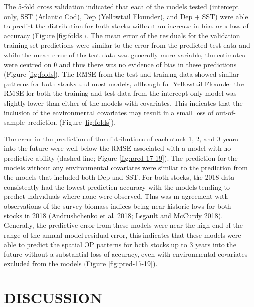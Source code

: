 \documentclass[
]{article}
\begin{document}
The 5-fold cross validation indicated that each of the models tested (intercept only, SST (Atlantic Cod), Dep (Yellowtail Flounder), and Dep + SST) were able to predict the distribution for both stocks without an increase in bias or a loss of accuracy (Figure \ref{fig:folds}). The mean error of the residuals for the validation training set predictions were similar to the error from the predicted test data and while the mean error of the test data was generally more variable, the estimates were centred on 0 and thus there was no evidence of bias in these predictions (Figure \ref{fig:folds}). The RMSE from the test and training data showed similar patterns for both stocks and most models, although for Yellowtail Flounder the RMSE for both the training and test data from the intercept only model was slightly lower than either of the models with covariates. This indicates that the inclusion of the environmental covariates may result in a small loss of out-of-sample prediction (Figure \ref{fig:folds}).

The error in the prediction of the distributions of each stock 1, 2, and 3 years into the future were well below the RMSE associated with a model with no predictive ability (dashed line; Figure \ref{fig:pred-17-19}). The prediction for the models without any environmental covariates were similar to the prediction from the models that included both Dep and SST. For both stocks, the 2018 data consistently had the lowest prediction accuracy with the models tending to predict individuals where none were observed. This was in agreement with observations of the survey biomass indices being near historic lows for both stocks in 2018 (\protect\hyperlink{ref-andrushchenkoAssessmentEasternGeorges2018}{Andrushchenko et al. 2018}; \protect\hyperlink{ref-legaultStockAssessmentGeorges2018}{Legault and McCurdy 2018}). Generally, the predictive error from these models were near the high end of the range of the annual model residual error, this indicates that these models were able to predict the spatial OP patterns for both stocks up to 3 years into the future without a substantial loss of accuracy, even with environmental covariates excluded from the models (Figure \ref{fig:pred-17-19}).

\hypertarget{discussion}{%
\section{DISCUSSION}\label{discussion}}
\end{document}
